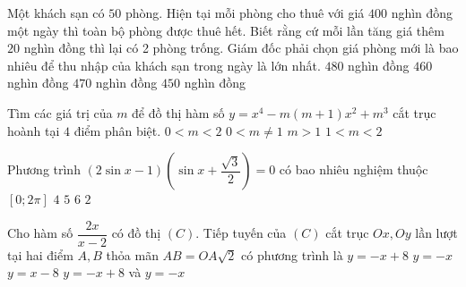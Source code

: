 \begin{ex}%
Một khách sạn có $50$ phòng. Hiện tại mỗi phòng cho thuê với giá $400$ nghìn đồng một ngày thì toàn bộ phòng được thuê hết. Biết rằng cứ mỗi lần tăng giá thêm $20$ nghìn đồng thì lại có 2 phòng trống. Giám đốc phải chọn giá phòng mới là bao nhiêu để thu nhập của khách sạn trong ngày là lớn nhất.
\choice
{$480$ nghìn đồng}
{$460$ nghìn đồng}
{$470$ nghìn đồng}
{\True $450$ nghìn đồng}
\end{ex}

\begin{ex}%
Tìm các giá trị của $m$ để đồ thị hàm số $y=x^4-m(m+1)x^2+m^3$ cắt trục hoành tại $4$ điểm phân biệt.
\choice
{$0<m<2$}
{\True $0<m \ne 1$}
{$m>1$}
{$1<m<2$}
\end{ex}

\begin{ex}%
Phương trình $(2\sin x -1)\left(\sin x +\dfrac{\sqrt{3}}{2}\right)=0$ có bao nhiêu nghiệm thuộc $[0; 2\pi]$
\choice
{\True $4$}
{$5$}
{$6$}
{$2$}
\end{ex}

\begin{ex}%
Cho hàm số $\dfrac{2x}{x-2}$ có đồ thị $(C)$. Tiếp tuyến của $(C)$ cắt trục $Ox, Oy$ lần lượt tại hai điểm $A, B$ thỏa mãn $AB=OA\sqrt{2}$ có phương trình là
\choice
{\True $y=-x+8$}
{$y=-x$}
{$y=x-8$}
{$y=-x+8$ và $y=-x$}
\end{ex}

